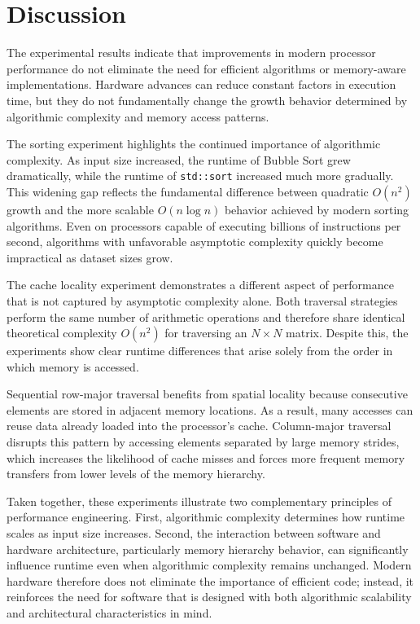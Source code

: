 \section{Discussion}

The experimental results indicate that improvements in modern processor performance do not eliminate the need for efficient algorithms or memory-aware implementations. Hardware advances can reduce constant factors in execution time, but they do not fundamentally change the growth behavior determined by algorithmic complexity and memory access patterns.

The sorting experiment highlights the continued importance of algorithmic complexity. As input size increased, the runtime of Bubble Sort grew dramatically, while the runtime of \texttt{std::sort} increased much more gradually. This widening gap reflects the fundamental difference between quadratic \(O(n^2)\) growth and the more scalable \(O(n \log n)\) behavior achieved by modern sorting algorithms. Even on processors capable of executing billions of instructions per second, algorithms with unfavorable asymptotic complexity quickly become impractical as dataset sizes grow.

The cache locality experiment demonstrates a different aspect of performance that is not captured by asymptotic complexity alone. Both traversal strategies perform the same number of arithmetic operations and therefore share identical theoretical complexity \(O(n^2)\) for traversing an \(N \times N\) matrix. Despite this, the experiments show clear runtime differences that arise solely from the order in which memory is accessed.

Sequential row-major traversal benefits from spatial locality because consecutive elements are stored in adjacent memory locations. As a result, many accesses can reuse data already loaded into the processor's cache. Column-major traversal disrupts this pattern by accessing elements separated by large memory strides, which increases the likelihood of cache misses and forces more frequent memory transfers from lower levels of the memory hierarchy.

Taken together, these experiments illustrate two complementary principles of performance engineering. First, algorithmic complexity determines how runtime scales as input size increases. Second, the interaction between software and hardware architecture, particularly memory hierarchy behavior, can significantly influence runtime even when algorithmic complexity remains unchanged. Modern hardware therefore does not eliminate the importance of efficient code; instead, it reinforces the need for software that is designed with both algorithmic scalability and architectural characteristics in mind.
